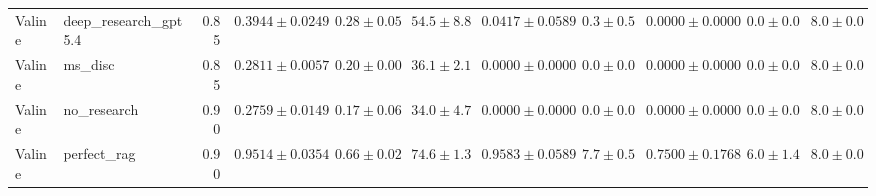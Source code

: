 \begin{table}[htbp]
\begin{tabular}{llrrrrrrrrr}
Valine & deep_research_gpt5.4 & 0.85 & $0.3944 \pm 0.0249$ & $0.28 \pm 0.05$ & $54.5 \pm 8.8$ & $0.0417 \pm 0.0589$ & $0.3 \pm 0.5$ & $0.0000 \pm 0.0000$ & $0.0 \pm 0.0$ & $8.0 \pm 0.0$ \\
Valine & ms_disc & 0.85 & $0.2811 \pm 0.0057$ & $0.20 \pm 0.00$ & $36.1 \pm 2.1$ & $0.0000 \pm 0.0000$ & $0.0 \pm 0.0$ & $0.0000 \pm 0.0000$ & $0.0 \pm 0.0$ & $8.0 \pm 0.0$ \\
Valine & no_research & 0.90 & \cellcolor{red!25}$0.2759 \pm 0.0149$ & $0.17 \pm 0.06$ & $34.0 \pm 4.7$ & $0.0000 \pm 0.0000$ & $0.0 \pm 0.0$ & $0.0000 \pm 0.0000$ & $0.0 \pm 0.0$ & $8.0 \pm 0.0$ \\
Valine & perfect_rag & 0.90 & \cellcolor{green!25}$0.9514 \pm 0.0354$ & $0.66 \pm 0.02$ & $74.6 \pm 1.3$ & $0.9583 \pm 0.0589$ & $7.7 \pm 0.5$ & $0.7500 \pm 0.1768$ & $6.0 \pm 1.4$ & $8.0 \pm 0.0$ \\
\bottomrule
\end{tabular}
\end{table}